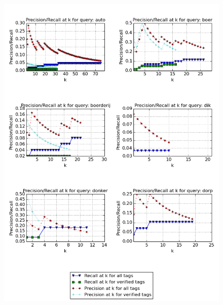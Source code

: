 \begin{figure}[H]
\centering
\includegraphics[width=\textwidth]{appendixd/queries-auto}
\end{figure}


